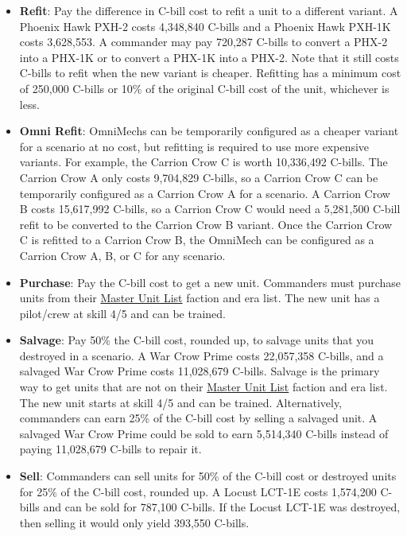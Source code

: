 \begin{itemize}
\item {\bfseries Refit}: Pay the difference in C-bill cost to refit a unit to a different variant.
A Phoenix Hawk PXH-2 costs 4,348,840 C-bills and a Phoenix Hawk PXH-1K costs 3,628,553.
A commander may pay 720,287 C-bills to convert a PHX-2 into a PHX-1K or to convert a PHX-1K into a PHX-2.
Note that it still costs C-bills to refit when the new variant is cheaper.
Refitting has a minimum cost of 250,000 C-bills or 10\% of the original C-bill cost of the unit, whichever is less.

\item {\bfseries Omni Refit}: OmniMechs can be temporarily configured as a cheaper variant for a scenario at no cost, but refitting is required to use more expensive variants.
For example, the Carrion Crow C is worth 10,336,492 C-bills.
The Carrion Crow A only costs 9,704,829 C-bills, so a Carrion Crow C can be temporarily configured as a Carrion Crow A for a scenario.
A Carrion Crow B costs 15,617,992 C-bills, so a Carrion Crow C would need a 5,281,500 C-bill refit to be converted to the Carrion Crow B variant.
Once the Carrion Crow C is refitted to a Carrion Crow B, the OmniMech can be configured as a Carrion Crow A, B, or C for any scenario.

\item {\bfseries Purchase}: Pay the C-bill cost to get a new unit.
Commanders must purchase units from their \href{http://www.masterunitlist.info}{Master Unit List} faction and era list.
The new unit has a pilot/crew at skill 4/5 and can be trained.

\item {\bfseries Salvage}: Pay 50\% the C-bill cost, rounded up, to salvage units that you destroyed in a scenario.
A War Crow Prime costs 22,057,358 C-bills, and a salvaged War Crow Prime costs 11,028,679 C-bills.
Salvage is the primary way to get units that are not on their \href{http://www.masterunitlist.info}{Master Unit List} faction and era list.
The new unit starts at skill 4/5 and can be trained.
Alternatively, commanders can earn 25\% of the C-bill cost by selling a salvaged unit.
A salvaged War Crow Prime could be sold to earn 5,514,340 C-bills instead of paying 11,028,679 C-bills to repair it.

\item {\bfseries Sell}: Commanders can sell units for 50\% of the C-bill cost or destroyed units for 25\% of the C-bill cost, rounded up.
A Locust LCT-1E costs 1,574,200 C-bills and can be sold for 787,100 C-bills.
If the Locust LCT-1E was destroyed, then selling it would only yield 393,550 C-bills.

\end{itemize}
